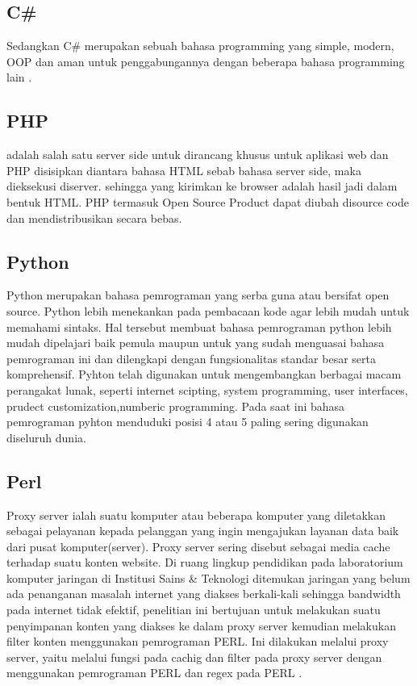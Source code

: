 \subsection {C\#}
	Sedangkan C\# merupakan sebuah bahasa programming yang simple, modern, OOP dan aman untuk 
penggabungannya dengan beberapa bahasa programming lain
\cite{hejlsberg2003c}.

\subsection {PHP}
 	adalah salah satu server side untuk dirancang khusus untuk aplikasi web dan PHP disisipkan diantara bahasa HTML sebab bahasa server side, maka dieksekusi diserver. sehingga yang kirimkan ke browser adalah hasil jadi dalam bentuk HTML. PHP termasuk Open Source Product dapat diubah disource code dan mendistribusikan secara bebas.

\subsection{Python}
	Python merupakan  bahasa pemrograman yang serba guna atau bersifat open source. 
Python lebih menekankan pada pembacaan  kode agar lebih mudah untuk memahami sintaks. 
Hal tersebut membuat bahasa pemrograman python lebih mudah dipelajari baik pemula maupun untuk yang 
sudah menguasai bahasa pemrograman ini dan dilengkapi dengan fungsionalitas standar besar serta 
komprehensif. Pyhton telah digunakan untuk mengembangkan berbagai macam perangakat lunak, seperti 
internet scipting, system programming, user interfaces, prudect customization,numberic programming. 
Pada saat ini bahasa pemrograman pyhton menduduki posisi 4 atau 5 paling sering digunakan diseluruh dunia.

\subsection{Perl}
	Proxy server ialah suatu komputer atau beberapa komputer yang diletakkan sebagai pelayanan kepada pelanggan yang ingin mengajukan layanan data baik dari pusat komputer(server).
Proxy server sering disebut sebagai media cache terhadap suatu konten website. Di ruang lingkup pendidikan pada laboratorium komputer jaringan di Institusi Sains \& Teknologi ditemukan jaringan yang belum ada penanganan masalah internet yang diakses berkali-kali sehingga bandwidth pada internet tidak efektif, penelitian ini bertujuan  untuk melakukan suatu penyimpanan konten yang diakses ke dalam proxy server kemudian melakukan filter konten menggunakan pemrograman PERL.
Ini dilakukan melalui proxy server, yaitu melalui fungsi pada cachig dan filter pada proxy server dengan menggunakan pemrograman PERL dan regex pada PERL
\cite{pamungkas2017implementasi}.

